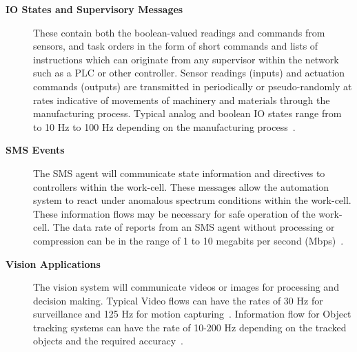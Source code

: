 \begin{description}
	\item[\textbf{IO States and Supervisory Messages}] These contain both the boolean-valued readings and commands from sensors, and task orders in the form of short commands and lists of instructions which can originate from any supervisor within the network such as a PLC or other controller. Sensor readings (inputs) and actuation commands (outputs) are transmitted in periodically or pseudo-randomly at rates indicative of movements of machinery and materials through the manufacturing process.  Typical analog and boolean IO states range from to 10 Hz to 100 Hz depending on the manufacturing process~\cite{TwinCAT}.
	
	\item[\textbf{SMS Events}] The SMS agent will communicate state information and directives to controllers within the work-cell.  These messages allow the automation system to react under anomalous spectrum conditions within the work-cell. These information flows may be necessary for safe operation of the work-cell. The data rate of reports from an SMS agent without processing or compression can be in the range of 1 to 10 megabits per second (Mbps)~\cite{Cuevas-Ruiz2015}.
	
	\item[\textbf{Vision Applications}] The vision system will communicate videos or images for processing and decision making. Typical Video flows can have the rates of 30 Hz for surveillance and 125 Hz for motion capturing~\cite{industrialCCTV, ELWeiss}. Information flow for Object tracking systems can have the rate of 10-200 Hz depending on the tracked objects and the required accuracy~\cite{lidar, motioncapture}. 
\end{description}



